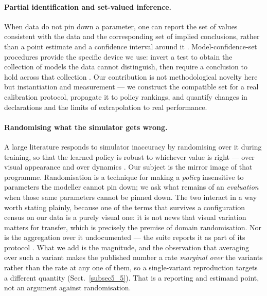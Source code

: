\documentclass[pdflatex,iicol,sn-apa]{sn-jnl}
\theoremstyle{remark}
\begin{document}
\paragraph{Partial identification and set-valued inference.}
When data do not pin down a parameter, one can report the set of values consistent with the data and
the corresponding set of implied conclusions, rather than a point estimate and a confidence interval
around it \citep{manski2003partial, tamer2010partial}. Model-confidence-set procedures provide the
specific device we use: invert a test to obtain the collection of models the data cannot
distinguish, then require a conclusion to hold across that collection \citep{hansen2011model}. Our
contribution is not methodological novelty here but instantiation and measurement --- we construct
the compatible set for a real calibration protocol, propagate it to policy rankings, and quantify
changes in declarations and the limits of extrapolation to real performance.

\paragraph{Randomising what the simulator gets wrong.}
A large literature responds to simulator inaccuracy by randomising over it during training, so that
the learned policy is robust to whichever value is right --- over visual appearance
\citep{tobin2017domain} and over dynamics \citep{peng2018sim}. Our subject is the mirror image of
that programme. Randomisation is a technique for making a \emph{policy} insensitive to parameters
the modeller cannot pin down; we ask what remains of an \emph{evaluation} when those same
parameters cannot be pinned down. The two interact in a way worth stating plainly, because one of the
terms that survives a configuration census on our data is a purely visual one: it is not news that
visual variation matters for transfer, which is precisely the premise of domain randomisation. Nor
is the aggregation over it undocumented --- the suite reports it as part of its protocol
\citep{li2024simpler}. What we add is the magnitude, and the observation that averaging over such a
variant makes the published number a rate \emph{marginal over} the variants rather than the rate at
any one of them, so a single-variant reproduction targets a different quantity
(Sect.~\ref{subsec5_5}). That is a reporting and estimand point, not an argument against
randomisation.
\end{document}
